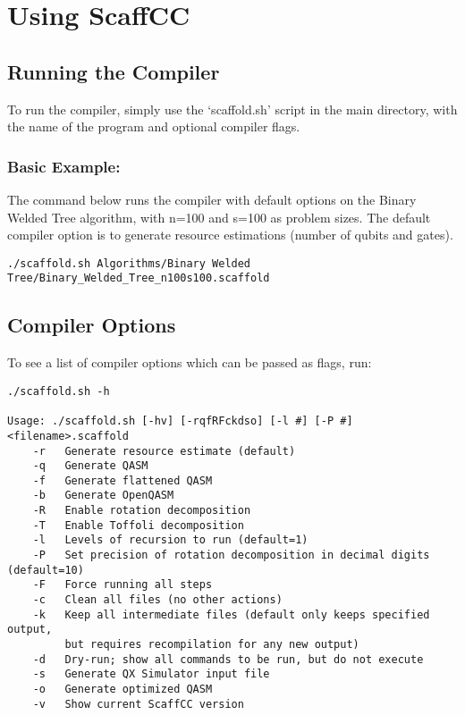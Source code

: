 \chapter{Using ScaffCC}\label{ch:usage}

\section{Running the Compiler}
To run the compiler, simply use the `scaffold.sh' script in the main directory, with the name of the program and optional compiler flags.

\subsection{Basic Example:}

The command below runs the compiler with default options on the Binary Welded Tree algorithm, with n=100 and s=100 as problem sizes.
The default compiler option is to generate resource estimations (number of qubits and gates).

\begin{lstlisting}
./scaffold.sh Algorithms/Binary Welded Tree/Binary_Welded_Tree_n100s100.scaffold
\end{lstlisting}


\section{Compiler Options}
To see a list of compiler options which can be passed as flags, run:

\begin{lstlisting}
./scaffold.sh -h

Usage: ./scaffold.sh [-hv] [-rqfRFckdso] [-l #] [-P #] <filename>.scaffold
    -r   Generate resource estimate (default)
    -q   Generate QASM
    -f   Generate flattened QASM
    -b   Generate OpenQASM
    -R   Enable rotation decomposition
    -T   Enable Toffoli decomposition
    -l   Levels of recursion to run (default=1)
    -P   Set precision of rotation decomposition in decimal digits (default=10)
    -F   Force running all steps
    -c   Clean all files (no other actions)
    -k   Keep all intermediate files (default only keeps specified output,
         but requires recompilation for any new output)
    -d   Dry-run; show all commands to be run, but do not execute
    -s   Generate QX Simulator input file 
    -o   Generate optimized QASM
    -v   Show current ScaffCC version
\end{lstlisting}



